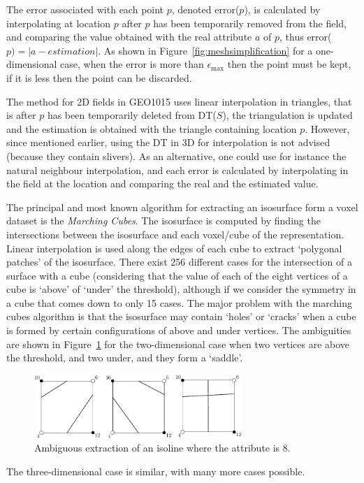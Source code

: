 The error associated with each point $p$, denoted error($p$), is calculated by interpolating at location $p$ after $p$ has been temporarily removed from the field, and comparing the value obtained with the real attribute $a$ of $p$, thus error($p) = |a - estimation|$. 
As shown in Figure~\ref{fig:meshsimplification} for a one-dimensional case, when the error is more than $\epsilon_{\max}$ then the point must be kept, if it is less then the point can be discarded.

The method for 2D fields in GEO1015 uses linear interpolation in triangles, that is after $p$ has been temporarily deleted from DT($S$), the triangulation is updated and the estimation is obtained with the triangle containing location $p$. 
However, since mentioned earlier, using the DT in 3D for interpolation is not advised (because they contain slivers).
As an alternative, one could use for instance the natural neighbour interpolation, and each error is calculated by interpolating in the field at the location and comparing the real and the estimated value.

The principal and most known algorithm for extracting an isosurface form a voxel dataset is the \emph{Marching Cu\-bes}. 
The isosurface is computed by finding the intersections between the isosurface and each voxel/cube of the representation. 
Linear interpolation is used along the edges of each cube to extract `polygonal patches' of the isosurface. 
There exist 256 different cases for the intersection of a surface with a cube (considering that the value of each of the eight vertices of a cube is `above' of `under' the threshold), although if we consider the symmetry in a cube that comes down to only 15 cases. 
The major problem with the marching cubes algorithm is that the isosurface may contain `holes' or `cracks' when a cube is formed by certain configurations of above and under vertices. 
The ambiguities are shown in Figure~\ref{fig:isosurface_ambiguity} for the two-dimensional case when two vertices are above the threshold, and two under, and they form a `saddle'.
\begin{figure}
  \centering
  \includegraphics[width=0.7\textwidth]{figs/isosurface_ambiguity}
  \caption[Ambiguous extraction of an isoline]{Ambiguous extraction of an isoline where the attribute is 8.}%
\label{fig:isosurface_ambiguity}
\end{figure}
The three-dimensional case is similar, with many more cases possible. 

